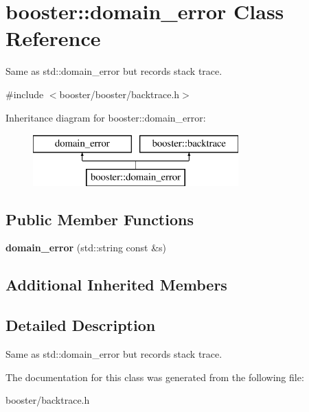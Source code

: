 \section{booster\-:\-:domain\-\_\-error Class Reference}
\label{classbooster_1_1domain__error}


Same as std\-::domain\-\_\-error but records stack trace.  




{\ttfamily \#include $<$booster/booster/backtrace.\-h$>$}

Inheritance diagram for booster\-:\-:domain\-\_\-error\-:\begin{figure}[H]
\begin{center}
\leavevmode
\includegraphics[height=2.000000cm]{classbooster_1_1domain__error}
\end{center}
\end{figure}
\subsection*{Public Member Functions}
\begin{DoxyCompactItemize}
\item 
{\bfseries domain\-\_\-error} (std\-::string const \&s)\label{classbooster_1_1domain__error_a06047ee402ac045abc0b6c3ef432ea06}

\end{DoxyCompactItemize}
\subsection*{Additional Inherited Members}


\subsection{Detailed Description}
Same as std\-::domain\-\_\-error but records stack trace. 

The documentation for this class was generated from the following file\-:\begin{DoxyCompactItemize}
\item 
booster/backtrace.\-h\end{DoxyCompactItemize}
